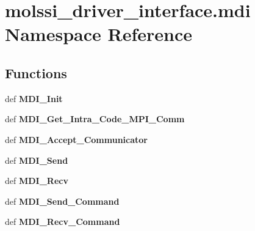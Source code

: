 \hypertarget{namespacemolssi__driver__interface_1_1mdi}{\section{molssi\-\_\-driver\-\_\-interface.\-mdi Namespace Reference}
\label{namespacemolssi__driver__interface_1_1mdi}
}
\subsection*{Functions}
\begin{DoxyCompactItemize}
\item 
\hypertarget{namespacemolssi__driver__interface_1_1mdi_a7fa45893a21039fbc4f4558adff09247}{def {\bfseries M\-D\-I\-\_\-\-Init}}\label{namespacemolssi__driver__interface_1_1mdi_a7fa45893a21039fbc4f4558adff09247}

\item 
\hypertarget{namespacemolssi__driver__interface_1_1mdi_a13123f38cd87a7834a1686f3620b26f5}{def {\bfseries M\-D\-I\-\_\-\-Get\-\_\-\-Intra\-\_\-\-Code\-\_\-\-M\-P\-I\-\_\-\-Comm}}\label{namespacemolssi__driver__interface_1_1mdi_a13123f38cd87a7834a1686f3620b26f5}

\item 
\hypertarget{namespacemolssi__driver__interface_1_1mdi_a6491914c9c4bb9d3818f53895a735625}{def {\bfseries M\-D\-I\-\_\-\-Accept\-\_\-\-Communicator}}\label{namespacemolssi__driver__interface_1_1mdi_a6491914c9c4bb9d3818f53895a735625}

\item 
\hypertarget{namespacemolssi__driver__interface_1_1mdi_a75666a1612c8fde657f9783f3c42fcaf}{def {\bfseries M\-D\-I\-\_\-\-Send}}\label{namespacemolssi__driver__interface_1_1mdi_a75666a1612c8fde657f9783f3c42fcaf}

\item 
\hypertarget{namespacemolssi__driver__interface_1_1mdi_aad08bf01bdb806196e9a41140325b6ae}{def {\bfseries M\-D\-I\-\_\-\-Recv}}\label{namespacemolssi__driver__interface_1_1mdi_aad08bf01bdb806196e9a41140325b6ae}

\item 
\hypertarget{namespacemolssi__driver__interface_1_1mdi_a09f3c593e5222f1adbec84021f2b3f34}{def {\bfseries M\-D\-I\-\_\-\-Send\-\_\-\-Command}}\label{namespacemolssi__driver__interface_1_1mdi_a09f3c593e5222f1adbec84021f2b3f34}

\item 
\hypertarget{namespacemolssi__driver__interface_1_1mdi_aad3f7850b204cc18683005d43797bebc}{def {\bfseries M\-D\-I\-\_\-\-Recv\-\_\-\-Command}}\label{namespacemolssi__driver__interface_1_1mdi_aad3f7850b204cc18683005d43797bebc}

\end{DoxyCompactItemize}
